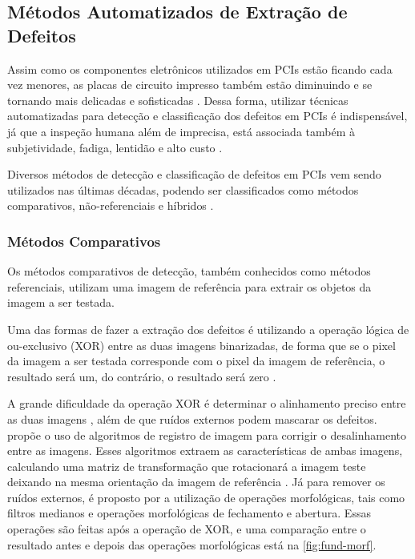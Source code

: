 \begin{figure}[h!]
\begin{subfigure}[H]{0.3\textwidth}
        \label{fig:fund-defeitos6}
    \end{subfigure}
	\label{fig:fund-defeitos}
\end{figure}

\subsection{Métodos Automatizados de Extração de Defeitos} \label{cap:fund-pcb-metodos}

Assim como os componentes eletrônicos utilizados em PCIs estão ficando cada vez menores, as placas de circuito impresso também estão diminuindo e se tornando mais delicadas e sofisticadas \cite{ref:Hu-Wang}. Dessa forma, utilizar técnicas automatizadas para detecção e classificação dos defeitos em PCIs é indispensável, já que a inspeção humana além de imprecisa, está associada também à subjetividade, fadiga, lentidão e alto custo \cite{ref:Leta-Feliciano-Martins}.

Diversos métodos de detecção e classificação de defeitos em PCIs vem sendo utilizados nas últimas décadas, podendo ser classificados como métodos comparativos, não-referenciais e híbridos .

\subsubsection{Métodos Comparativos} \label{cap:fund-pcb-metodos-comp}
Os métodos comparativos de detecção, também conhecidos como métodos referenciais, utilizam uma imagem de referência para extrair os objetos da imagem a ser testada.

Uma das formas de fazer a extração dos defeitos é utilizando a operação lógica de ou-exclusivo (XOR) entre as duas imagens binarizadas, de forma que se o pixel da imagem a ser testada corresponde com o pixel da imagem de referência, o resultado será um, do contrário, o resultado será zero \cite{ref:Huang-et-al}.

A grande dificuldade da operação XOR é determinar o alinhamento preciso entre as duas imagens \cite{ref:Ding-et-al}, além de que ruídos externos podem mascarar os defeitos.  propõe o uso de algoritmos de registro de imagem para corrigir o desalinhamento entre as imagens. Esses algoritmos extraem as características de ambas imagens, calculando uma matriz de transformação que rotacionará a imagem teste deixando na mesma orientação da imagem de referência \cite{ref:Huang-et-al}. Já para remover os ruídos externos, é proposto por  a utilização de operações morfológicas, tais como filtros medianos e operações morfológicas de fechamento e abertura. Essas operações são feitas após a operação de XOR, e uma comparação entre o resultado antes e depois das operações morfológicas está na \autoref{fig:fund-morf}.

